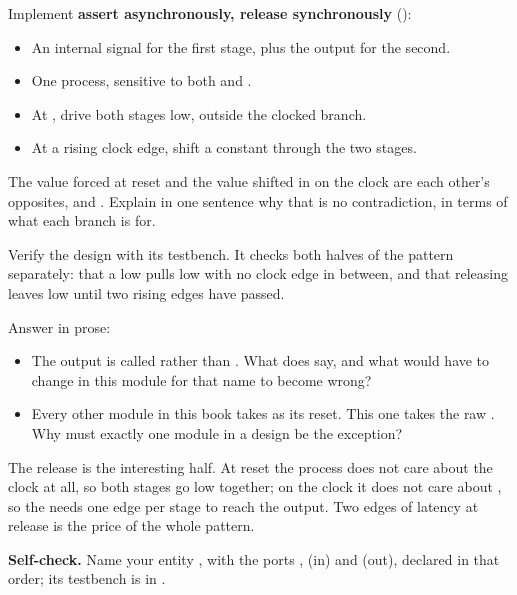  Implement \textbf{assert asynchronously, release synchronously}
():
\begin{itemize}
  \item An internal signal for the first stage, plus the output for the second.
  \item One process, sensitive to both  and .
  \item At , drive both stages low, outside the clocked branch.
  \item At a rising clock edge, shift a constant  through the two stages.
\end{itemize}

 The value forced at reset and the value shifted in on the clock are each other's
opposites,  and . Explain in one sentence why that is no contradiction, in
terms of what each branch is for.

 Verify the design with its testbench. It checks both halves of the pattern separately:
that a low  pulls  low with no clock edge in between, and that
releasing  leaves  low until two rising edges have passed.

 Answer in prose:
\begin{itemize}
  \item The output is called  rather than . What does 
    say, and what would have to change in this module for that name to become wrong?
  \item Every other module in this book takes  as its reset. This one takes the
    raw . Why must exactly one module in a design be the exception?
\end{itemize}

\note[Hint]The release is the interesting half. At reset the process does not care about the clock
at all, so both stages go low together; on the clock it does not care about , so the
 needs one edge per stage to reach the output. Two edges of latency at release is the
price of the whole pattern.


\begin{selfcheck}
\textbf{Self-check.} Name your entity , with the ports ,
 (in) and  (out), declared in that order; its testbench is in
.
\end{selfcheck}

